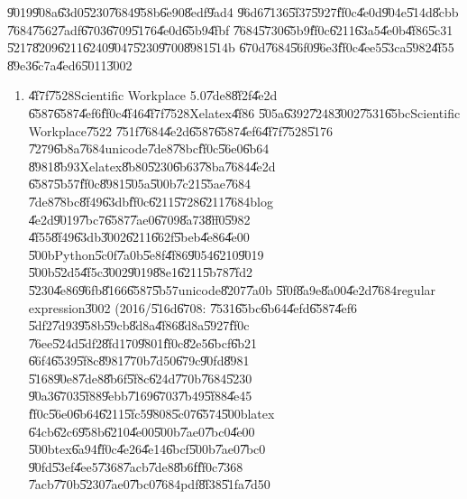 \bigskip

\U{9019}\U{908a}\U{63d0}\U{5230}\U{7684}\U{958b}\U{6e90}\U{8edf}\U{9ad4}%
\U{96d6}\U{7136}\U{5f37}\U{5927}\U{ff0c}\U{4e0d}\U{904e}\U{514d}\U{8cbb}%
\U{7684}\U{7562}\U{7adf}\U{6703}\U{6709}\U{5176}\U{4e0d}\U{65b9}\U{4fbf}%
\U{7684}\U{5730}\U{65b9}\U{ff0c}\U{6211}\U{63a5}\U{4e0b}\U{4f86}\U{5c31}%
\U{5217}\U{8209}\U{6211}\U{6240}\U{9047}\U{5230}\U{9700}\U{8981}\U{514b}%
\U{670d}\U{7684}\U{56f0}\U{96e3}\U{ff0c}\U{4ee5}\U{53ca}\U{5982}\U{4f55}%
\U{89e3}\U{6c7a}\U{4ed6}\U{5011}\U{3002}

\begin{enumerate}
\item \U{4f7f}\U{7528}Scientific Workplace 5.0\U{7de8}\U{8f2f}\U{4e2d}%
\U{6587}\U{6587}\U{4ef6}\U{ff0c}\U{4f46}\U{4f7f}\U{7528}Xelatex\U{4f86}%
\U{505a}\U{6392}\U{7248}\U{3002}\U{7531}\U{65bc}Scientific Workplace\U{7522}%
\U{751f}\U{7684}\U{4e2d}\U{6587}\U{6587}\U{4ef6}\U{4f7f}\U{7528}\U{5176}%
\U{7279}\U{6b8a}\U{7684}unicode\U{7de8}\U{78bc}\U{ff0c}\U{56e0}\U{6b64}%
\U{8981}\U{8b93}Xelatex\U{8b80}\U{5230}\U{6b63}\U{78ba}\U{7684}\U{4e2d}%
\U{6587}\U{5b57}\U{ff0c}\U{8981}\U{505a}\U{500b}\U{7c21}\U{55ae}\U{7684}%
\U{7de8}\U{78bc}\U{8f49}\U{63db}\U{ff0c}\U{6211}\U{5728}\U{6211}\U{7684}blog%
\U{4e2d}\U{9019}\U{7bc7}\U{6587}\U{7ae0}\U{6709}\U{8a73}\U{8ff0}\U{5982}%
\U{4f55}\U{8f49}\U{63db}\U{3002}\U{6211}\U{662f}\U{5beb}\U{4e86}\U{4e00}%
\U{500b}Python\U{5c0f}\U{7a0b}\U{5e8f}\U{4f86}\U{9054}\U{6210}\U{9019}%
\U{500b}\U{52d5}\U{4f5c}\U{3002}\U{9019}\U{88e1}\U{6211}\U{5b78}\U{7fd2}%
\U{5230}\U{4e86}\U{96fb}\U{8166}\U{6587}\U{5b57}unicode\U{8207}\U{7a0b}%
\U{5f0f}\U{8a9e}\U{8a00}\U{4e2d}\U{7684}regular expression\U{3002}\newline
\newline
(2016/\U{516d}\U{6708}: \U{7531}\U{65bc}\U{6b64}\U{4efd}\U{6587}\U{4ef6}%
\U{5df2}\U{7d93}\U{958b}\U{59cb}\U{8d8a}\U{4f86}\U{8d8a}\U{5927}\U{ff0c}%
\U{76ee}\U{524d}\U{5df2}\U{8fd1}70\U{9801}\U{ff0c}\U{82e5}\U{6bcf}\U{6b21}%
\U{66f4}\U{6539}\U{5f8c}\U{8981}\U{770b}\U{7d50}\U{679c}\U{90fd}\U{8981}%
\U{5168}\U{90e8}\U{7de8}\U{8b6f}\U{5f8c}\U{624d}\U{770b}\U{7684}\U{5230}%
\U{90a3}\U{6703}\U{5f88}\U{9ebb}\U{7169}\U{6703}\U{7b49}\U{5f88}\U{4e45}%
\U{ff0c}\U{56e0}\U{6b64}\U{6211}\U{5fc5}\U{9808}\U{5c07}\U{6574}\U{500b}latex%
\U{64cb}\U{62c6}\U{958b}\U{6210}\U{4e00}\U{500b}\U{7ae0}\U{7bc0}\U{4e00}%
\U{500b}tex\U{6a94}\U{ff0c}\U{4e26}\U{4e14}\U{6bcf}\U{500b}\U{7ae0}\U{7bc0}%
\U{90fd}\U{53ef}\U{4ee5}\U{7368}\U{7acb}\U{7de8}\U{8b6f}\U{ff0c}\U{7368}%
\U{7acb}\U{770b}\U{5230}\U{7ae0}\U{7bc0}\U{7684}pdf\U{8f38}\U{51fa}\U{7d50}%

\end{enumerate}
